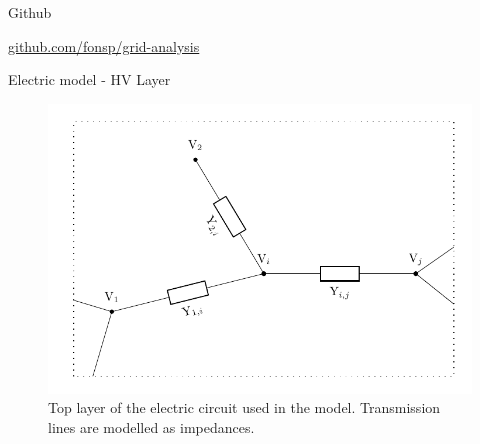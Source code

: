 \documentclass[10pt]{beamer}
\begin{document}
{
\begin{frame}[plain]
\end{frame}
}

\begin{frame}{Github}
  \begin{center}\href{https://github.com/fonsp/grid-analysis}{github.com/fonsp/grid-analysis}\end{center}
\end{frame}


\begin{frame}{Electric model - HV Layer}
  \begin{figure}
      \centering
      \includegraphics[width=.8\textwidth]{img/vettegraaftoplayer.pdf}
      \caption{Top layer of the electric circuit used in the model. Transmission lines are modelled as impedances.}
      \label{fig:my_label}
  \end{figure}
\end{frame}
\end{document}
